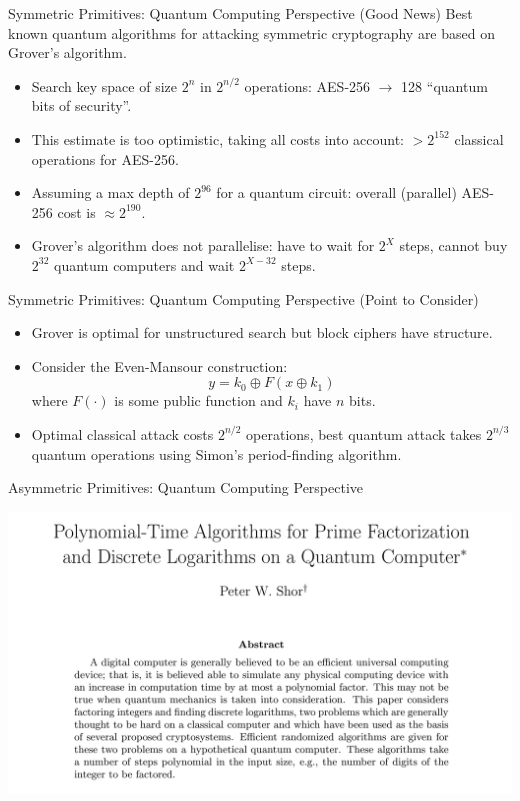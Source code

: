 \documentclass[xcolor=table,10pt,aspectratio=169]{beamer}
\begin{document}
\begin{frame}[label={sec:orgdb6376b}]{Symmetric Primitives: Quantum Computing Perspective (Good News)}
Best known quantum algorithms for attacking symmetric cryptography are based on Grover’s algorithm. 

\begin{itemize}
\item Search key space of size \(2^n\) in \(2^{n/2}\) operations: AES-256 \(\rightarrow\) 128 “quantum bits of security”.
\item This estimate is too optimistic, taking all costs into account: \(> 2^{152}\) classical operations for AES-256.
\item Assuming a max depth of \(2^{96}\) for a quantum circuit: overall (parallel) AES-256 cost is \(\approx 2^{190}\).
\item Grover’s algorithm does not parallelise: have to wait for \(2^{X}\) steps, cannot buy \(2^{32}\) quantum computers and wait \(2^{X-32}\) steps.
\end{itemize}
\end{frame}

\begin{frame}[label={sec:orge4a790b}]{Symmetric Primitives: Quantum Computing Perspective (Point to Consider)}
\begin{itemize}
\item Grover is optimal for unstructured search but block ciphers have structure.
\item Consider the Even-Mansour construction: \[y = k_0 \oplus F(x \oplus k_1)\] where \(F(\cdot)\) is some public function and \(k_i\) have \(n\) bits.
\item Optimal classical attack costs \(2^{n/2}\) operations, best quantum attack takes \(2^{n/3}\) quantum operations using Simon’s period-finding algorithm.
\end{itemize}
\end{frame}

\begin{frame}[label={sec:org788b574}]{Asymmetric Primitives: Quantum Computing Perspective}
\begin{center}
\includegraphics[width=.9\linewidth]{./shor.png}
\end{center}
\end{frame}
\end{document}
